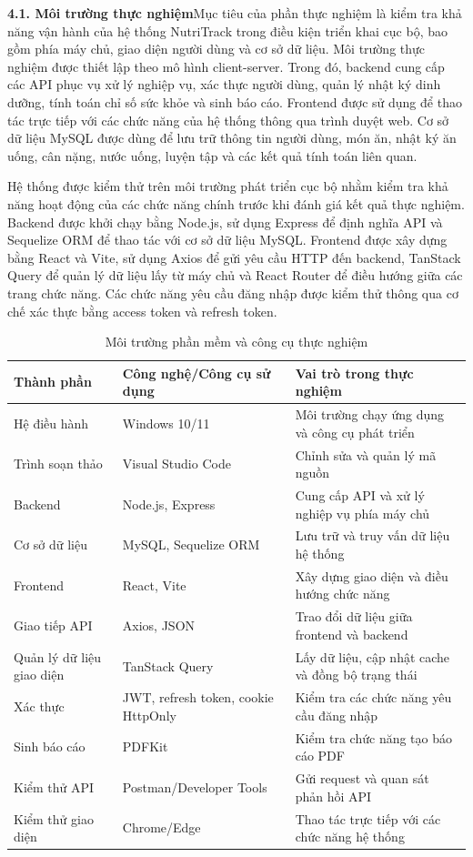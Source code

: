 \textbf{4.1. Môi trường thực nghiệm}Mục tiêu của phần thực nghiệm là kiểm tra khả năng vận hành của hệ thống NutriTrack trong điều kiện triển khai cục bộ, bao gồm phía máy chủ, giao diện người dùng và cơ sở dữ liệu. Môi trường thực nghiệm được thiết lập theo mô hình client-server. Trong đó, backend cung cấp các API phục vụ xử lý nghiệp vụ, xác thực người dùng, quản lý nhật ký dinh dưỡng, tính toán chỉ số sức khỏe và sinh báo cáo. Frontend được sử dụng để thao tác trực tiếp với các chức năng của hệ thống thông qua trình duyệt web. Cơ sở dữ liệu MySQL được dùng để lưu trữ thông tin người dùng, món ăn, nhật ký ăn uống, cân nặng, nước uống, luyện tập và các kết quả tính toán liên quan.

Hệ thống được kiểm thử trên môi trường phát triển cục bộ nhằm kiểm tra khả năng hoạt động của các chức năng chính trước khi đánh giá kết quả thực nghiệm. Backend được khởi chạy bằng Node.js, sử dụng Express để định nghĩa API và Sequelize ORM để thao tác với cơ sở dữ liệu MySQL. Frontend được xây dựng bằng React và Vite, sử dụng Axios để gửi yêu cầu HTTP đến backend, TanStack Query để quản lý dữ liệu lấy từ máy chủ và React Router để điều hướng giữa các trang chức năng. Các chức năng yêu cầu đăng nhập được kiểm thử thông qua cơ chế xác thực bằng access token và refresh token.

\begin{table}[H]
\centering
\caption{Môi trường phần mềm và công cụ thực nghiệm}
\begin{tabular}{|p{4cm}|p{5.5cm}|p{5.5cm}|}
\hline
\textbf{Thành phần} & \textbf{Công nghệ/Công cụ sử dụng} & \textbf{Vai trò trong thực nghiệm} \\ \hline
Hệ điều hành & Windows 10/11 & Môi trường chạy ứng dụng và công cụ phát triển \\ \hline
Trình soạn thảo & Visual Studio Code & Chỉnh sửa và quản lý mã nguồn \\ \hline
Backend & Node.js, Express & Cung cấp API và xử lý nghiệp vụ phía máy chủ \\ \hline
Cơ sở dữ liệu & MySQL, Sequelize ORM & Lưu trữ và truy vấn dữ liệu hệ thống \\ \hline
Frontend & React, Vite & Xây dựng giao diện và điều hướng chức năng \\ \hline
Giao tiếp API & Axios, JSON & Trao đổi dữ liệu giữa frontend và backend \\ \hline
Quản lý dữ liệu giao diện & TanStack Query & Lấy dữ liệu, cập nhật cache và đồng bộ trạng thái \\ \hline
Xác thực & JWT, refresh token, cookie HttpOnly & Kiểm tra các chức năng yêu cầu đăng nhập \\ \hline
Sinh báo cáo & PDFKit & Kiểm tra chức năng tạo báo cáo PDF \\ \hline
Kiểm thử API & Postman/Developer Tools & Gửi request và quan sát phản hồi API \\ \hline
Kiểm thử giao diện & Chrome/Edge & Thao tác trực tiếp với các chức năng hệ thống \\ \hline
\end{tabular}
\end{table}

